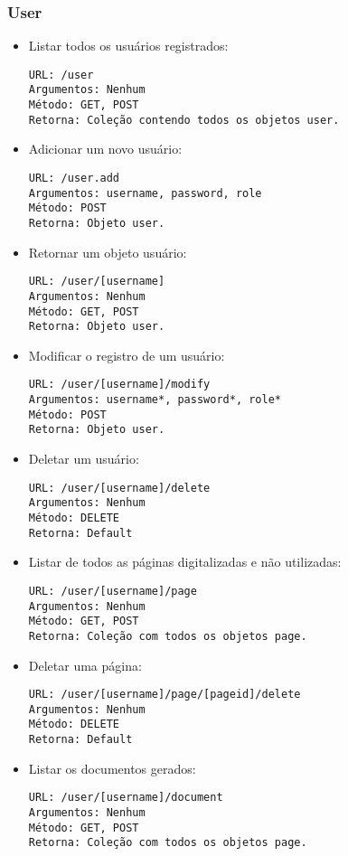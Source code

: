 \subsubsection{User}

\begin{itemize}

\item Listar todos os usuários registrados:
\begin{verbatim}
URL: /user
Argumentos: Nenhum
Método: GET, POST
Retorna: Coleção contendo todos os objetos user.
\end{verbatim}

\item Adicionar um novo usuário:
\begin{verbatim}
URL: /user.add
Argumentos: username, password, role
Método: POST
Retorna: Objeto user.
\end{verbatim}

\item Retornar um objeto usuário:
\begin{verbatim}
URL: /user/[username]
Argumentos: Nenhum
Método: GET, POST
Retorna: Objeto user.
\end{verbatim}

\item Modificar o registro de um usuário:
\begin{verbatim}
URL: /user/[username]/modify
Argumentos: username*, password*, role*
Método: POST
Retorna: Objeto user.
\end{verbatim}

\item Deletar um usuário:
\begin{verbatim}
URL: /user/[username]/delete
Argumentos: Nenhum
Método: DELETE
Retorna: Default
\end{verbatim}

\item Listar de todos as páginas digitalizadas e não utilizadas: 
\begin{verbatim}
URL: /user/[username]/page
Argumentos: Nenhum
Método: GET, POST
Retorna: Coleção com todos os objetos page.
\end{verbatim}

\item Deletar uma página: 
\begin{verbatim}
URL: /user/[username]/page/[pageid]/delete
Argumentos: Nenhum
Método: DELETE
Retorna: Default 
\end{verbatim}

\item Listar os documentos gerados:
\begin{verbatim}
URL: /user/[username]/document
Argumentos: Nenhum
Método: GET, POST
Retorna: Coleção com todos os objetos page.
\end{verbatim}


\end{itemize}
